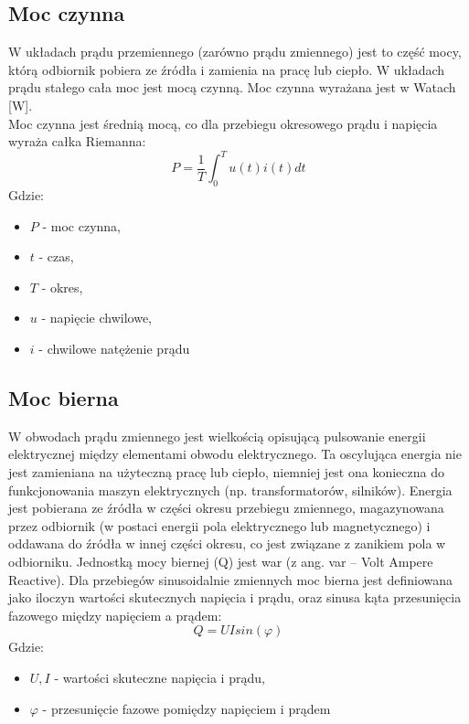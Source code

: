 \documentclass[12pt]{article}
\begin{document}
\subsection{Moc czynna}
 W układach prądu przemiennego (zarówno prądu zmiennego) jest to część mocy, którą odbiornik pobiera ze źródła i zamienia na pracę lub ciepło. W układach prądu stałego cała moc jest mocą czynną. Moc czynna wyrażana jest w Watach [W].\\
 Moc czynna jest średnią mocą, co dla przebiegu okresowego prądu i napięcia wyraża całka Riemanna:
\begin{equation}
 P={\frac {1}{T}}\int _{0}^{T}u(t)i(t)dt
 \end{equation}
 Gdzie:
 \begin{itemize}
     \item $P$ - moc czynna,
     \item $t$ - czas,
     \item $T$ - okres,
     \item $u$ - napięcie chwilowe,
     \item $i$ - chwilowe natężenie prądu
 \end{itemize}
\subsection{Moc bierna}
W obwodach prądu zmiennego jest wielkością opisującą pulsowanie energii elektrycznej między elementami obwodu elektrycznego. Ta oscylująca energia nie jest zamieniana na użyteczną pracę lub ciepło, niemniej jest ona konieczna do funkcjonowania maszyn elektrycznych (np. transformatorów, silników). Energia jest pobierana ze źródła w części okresu przebiegu zmiennego, magazynowana przez odbiornik (w postaci energii pola elektrycznego lub magnetycznego) i oddawana do źródła w innej części okresu, co jest związane z zanikiem pola w odbiorniku. Jednostką mocy biernej (Q) jest war (z ang. var – Volt Ampere Reactive).
Dla przebiegów sinusoidalnie zmiennych moc bierna jest definiowana jako iloczyn wartości skutecznych napięcia i prądu, oraz sinusa kąta przesunięcia fazowego między napięciem a prądem:
\begin{equation}
    Q = UIsin(\varphi)
\end{equation}
Gdzie:
\begin{itemize}
    \item $U, I$ - wartości skuteczne napięcia i prądu,
    \item $\varphi$ - przesunięcie fazowe pomiędzy napięciem i prądem
\end{itemize}
\end{document}
